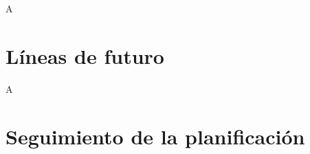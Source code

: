\documentclass[IB,BIB]{TFUOC}%
\begin{document}
% 

A


\section{Líneas de futuro}


A


\section{Seguimiento de la planificación}

\end{document}
